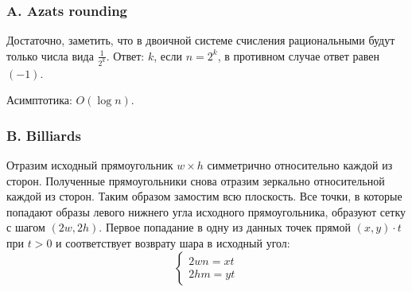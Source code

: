 \subsubsection*{A. Azats rounding}


Достаточно, заметить, что в двоичной системе счисления рациональными будут только числа вида $\frac{1}{2^k}$. Ответ: $k$, если $n = 2^k$, в противном случае ответ равен $(-1)$.

Асимптотика: $O(\log{n})$.

\subsubsection*{B. Billiards}


Отразим исходный прямоугольник $w \times h$ симметрично относительно каждой из сторон. Полученные прямоугольники  снова отразим зеркально относительной каждой из сторон. Таким образом замостим всю плоскость. Все точки, в которые попадают образы левого нижнего угла исходного прямоугольника, образуют сетку с шагом $(2w, 2h)$. Первое попадание в одну из данных точек прямой $(x, y) \cdot t$ при $t > 0$ и соответствует возврату шара в исходный угол:
$$
\begin{cases}
2 w n = x t\\
2 h m = y t
\end{cases}
$$

\begin{center}
\end{center}

